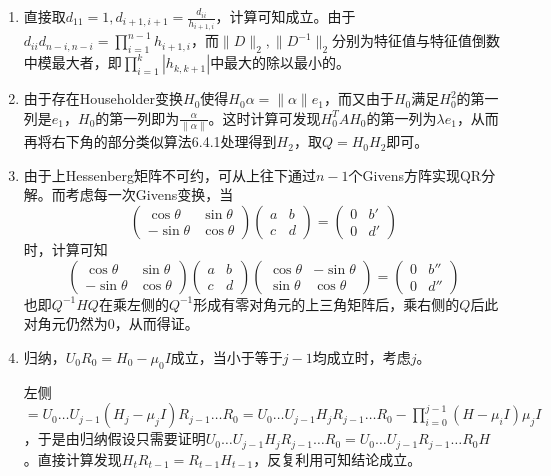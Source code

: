 \documentclass[a4paper,UTF8,fontset=windows]{ctexart}
\begin{document}
\begin{enumerate}
\item
直接取$d_{11}=1,d_{i+1,i+1}=\frac{d_{ii}}{h_{i+1,i}}$，计算可知成立。由于$d_{ii}d_{n-i,n-i}=\prod_{i=1}^{n-1}h_{i+1,i}$，而$\|D\|_2,\|D^{-1}\|_2$分别为特征值与特征值倒数中模最大者，即$\prod_{i=1}^k|h_{k,k+1}|$中最大的除以最小的。

\item
由于存在Householder变换$H_0$使得$H_0\alpha=\|\alpha\|e_1$，而又由于$H_0$满足$H_0^2$的第一列是$e_1$，$H_0$的第一列即为$\frac{\alpha}{\|\alpha\|}$。这时计算可发现$H_0^TAH_0$的第一列为$\lambda e_1$，从而再将右下角的部分类似算法6.4.1处理得到$H_2$，取$Q=H_0H_2$即可。

\item
由于上Hessenberg矩阵不可约，可从上往下通过$n-1$个Givens方阵实现QR分解。而考虑每一次Givens变换，当
$$\begin{pmatrix}\cos\theta&\sin\theta\\-\sin\theta&\cos\theta\end{pmatrix}\begin{pmatrix}a&b\\c&d\end{pmatrix}=\begin{pmatrix}0&b'\\0&d'\end{pmatrix}$$
时，计算可知
$$\begin{pmatrix}\cos\theta&\sin\theta\\-\sin\theta&\cos\theta\end{pmatrix}\begin{pmatrix}a&b\\c&d\end{pmatrix}\begin{pmatrix}\cos\theta&-\sin\theta\\\sin\theta&\cos\theta\end{pmatrix}=\begin{pmatrix}0&b''\\0&d''\end{pmatrix}$$
也即$Q^{-1}HQ$在乘左侧的$Q^{-1}$形成有零对角元的上三角矩阵后，乘右侧的$Q$后此对角元仍然为0，从而得证。

\item
归纳，$U_0R_0=H_0-\mu_0I$成立，当小于等于$j-1$均成立时，考虑$j$。

左侧$=U_0\dots U_{j-1}(H_j-\mu_jI)R_{j-1}\dots R_0=U_0\dots U_{j-1}H_jR_{j-1}\dots R_0-\prod_{i=0}^{j-1}(H-\mu_iI)\mu_jI$，于是由归纳假设只需要证明$U_0\dots U_{j-1}H_jR_{j-1}\dots R_0=U_0\dots U_{j-1}R_{j-1}\dots R_0H$。直接计算发现$H_tR_{t-1}=R_{t-1}H_{t-1}$，反复利用可知结论成立。


\end{enumerate}
\end{document}
